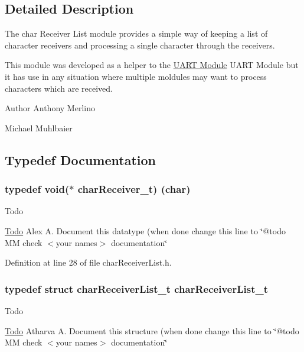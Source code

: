 \subsection{Detailed Description}
The {\ttfamily char} Receiver List module provides a simple way of keeping a list of character receivers and processing a single character through the receivers.

This module was developed as a helper to the \hyperlink{group__uart}{U\+A\+R\+T Module} U\+A\+R\+T Module but it has use in any situation where multiple moldules may want to process characters which are received.

\begin{DoxyAuthor}{Author}
Anthony Merlino 

Michael Muhlbaier 
\end{DoxyAuthor}


\subsection{Typedef Documentation}
\hypertarget{group__receiverlist_ga69666a2f4dbb47a4ffd7b07c252777cf}{}
\subsubsection[{char\+Receiver\+\_\+t}]{\setlength{\rightskip}{0pt plus 5cm}typedef void($\ast$ char\+Receiver\+\_\+t) (char)}\label{group__receiverlist_ga69666a2f4dbb47a4ffd7b07c252777cf}
\begin{DoxyRefDesc}{Todo}
\item[\hyperlink{todo__todo000001}{Todo}]Alex A. Document this datatype (when done change this line to \char`\"{}@todo M\+M check $<$your names$>$ documentation\char`\"{} \end{DoxyRefDesc}


Definition at line 28 of file char\+Receiver\+List.\+h.

\hypertarget{group__receiverlist_gaf028d96c57583ae1c99867ab37a4e097}{}
\subsubsection[{char\+Receiver\+List\+\_\+t}]{\setlength{\rightskip}{0pt plus 5cm}typedef struct {\bf char\+Receiver\+List\+\_\+t}  {\bf char\+Receiver\+List\+\_\+t}}\label{group__receiverlist_gaf028d96c57583ae1c99867ab37a4e097}
\begin{DoxyRefDesc}{Todo}
\item[\hyperlink{todo__todo000002}{Todo}]Atharva A. Document this structure (when done change this line to \char`\"{}@todo M\+M check $<$your names$>$ documentation\char`\"{} \end{DoxyRefDesc}


